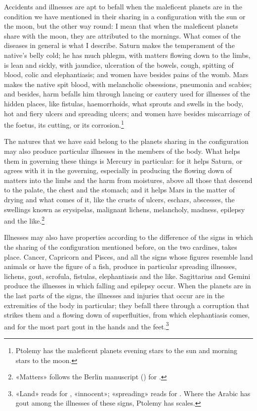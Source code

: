 \documentclass[11pt]{article}
\newcommand{\Fol}[1]{\marginpar{\footnotesize\color{gray}f.\,#1}}
\begin{document}
\par \Fol{54v}Accidents and illnesses are apt to befall when the maleficent planets are in the condition we have mentioned in their sharing in a configuration with the sun or the moon, but the other way round: I mean that when the maleficent planets share with the moon, they are attributed to the mornings. What comes of the diseases in general is what I describe. Saturn makes the temperament of the native's belly cold; he has much phlegm, with matters flowing down to the limbs, is lean and sickly, with jaundice, ulceration of the bowels, cough, spitting of blood, colic and elephantiasis; and women have besides pains of the womb. Mars makes the native spit blood, with melancholic obsessions, pneumonia and scabies; and besides, harm befalls him through lancing or cautery used for illnesses of the hidden places, like fistulas, haemorrhoids, what sprouts and swells in the body, hot and fiery ulcers and spreading ulcers; and women have besides miscarriage of the foetus, its cutting, or its corrosion.\footnote{Ptolemy has the maleficent planets evening stars to the sun and morning stars to the moon.}\par
\par The natures that we have said belong to the planets sharing in the configuration may also produce particular illnesses in the members of the body. What helps them in governing these things is Mercury in particular: for it helps Saturn, or agrees with it in the governing, especially in producing the flowing down of matters into the limbs and the harm from moistures, above all those that descend to the palate, the chest and the stomach; and it helps Mars in the matter of drying and what comes of it, like the crusts of ulcers, eschars, abscesses, the swellings known as erysipelas, malignant lichens, melancholy, madness, epilepsy and the like.\footnote{«Matters» follows the Berlin manuscript () for .}\par
\par Illnesses may also have properties according to the difference of the signs in which the sharing of the configuration mentioned before, on the two cardines, takes place. Cancer, Capricorn and Pisces, and all the signs whose figures resemble land animals or have the figure of a fish, produce in particular spreading illnesses, lichens, gout, scrofula, fistulas, elephantiasis and the like. Sagittarius and Gemini produce the illnesses in which falling and epilepsy occur. When the planets are in the last parts of the signs, the illnesses and injuries that occur are in the extremities of the body in particular; they befall there through a corruption that strikes them and a flowing down of superfluities, from which elephantiasis comes, and for the most part gout in the hands and the feet.\footnote{«Land» reads  for , «innocent»; «spreading» reads  for . Where the Arabic has gout among the illnesses of these signs, Ptolemy has scales.}\par
\end{document}
